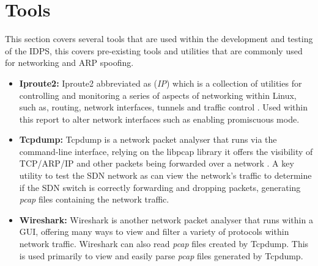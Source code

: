 \documentclass[12pt, oneside]{book}
\begin{document}

\newpage
\section{Tools}
This section covers several tools that are used within the development and testing of the IDPS, this covers pre-existing
tools and utilities that are commonly used for networking and ARP spoofing.

\label{subsec:Scapy}
\begin{itemize}
	\itemsep0em
	\item \textbf{Iproute2:} Iproute2 abbreviated as (\emph{IP}) which is a collection of utilities for controlling and monitoring
    a series of aspects of networking within Linux, such as, routing, network interfaces, tunnels and traffic control \cite{hemminger}.
    Used within this report to alter network interfaces such as enabling promiscuous mode.
  \item \textbf{Tcpdump:} Tcpdump is a network packet analyser that runs via the command-line interface, relying on the 
    libpcap library it offers the visibility of TCP/ARP/IP and other packets being forwarded over a network \cite{richardson}.
    A key utility to test the SDN network as can view the network's traffic to determine if the SDN switch is
    correctly forwarding and dropping packets, generating \emph{pcap} files containing the network traffic.

  \item \textbf{Wireshark:} Wireshark is another network packet analyser that runs within a GUI, offering 
    many ways to view and filter a variety of protocols within network traffic. Wireshark can also read \emph{pcap}
    files created by Tcpdump\cite{wireshark}. This is used primarily to view and easily parse \emph{pcap} files generated
    by Tcpdump.


\end{itemize}
\end{document}
